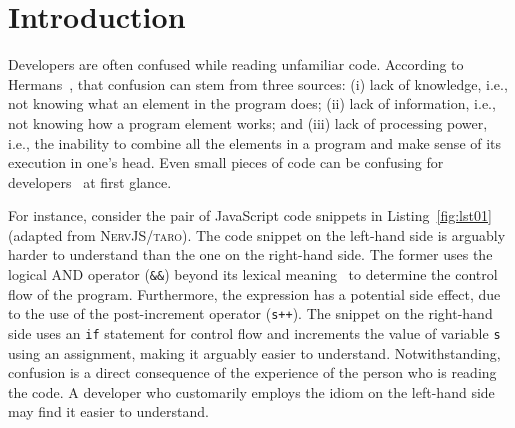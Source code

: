 \section{Introduction}
\label{intro}





Developers are often confused while reading unfamiliar code. According to Hermans~\cite{ProgrammersBrain}, that confusion can stem from three sources: (i) lack of knowledge, i.e., not knowing what an element in the program does; (ii) lack of information, i.e., not knowing how a program element works; and (iii) lack of processing power, i.e., the inability to combine all the elements in a program and make sense of its execution in one's head. Even small pieces of code can be confusing for developers~\cite{Ajami:2017:SPI,DBLP:conf/sigsoft/GopsteinIYDZYC17} at first glance.

For instance, consider the pair of JavaScript code snippets in Listing~\ref{fig:lst01} (adapted from \textsc{NervJS/taro}). The code snippet on the left-hand side is arguably harder to understand than the one on the right-hand side. The former uses the logical AND operator (\texttt{\&\&}) beyond its lexical meaning~\cite{castor2018} to determine the control flow of the program. Furthermore, the expression has a potential side effect, due to the use of the post-increment operator (\texttt{s++}). The snippet on the right-hand side uses an \texttt{if} statement for control flow and increments the value of variable \texttt{s} using an assignment, making it arguably easier to understand. Notwithstanding, confusion is a direct consequence of the experience of the person who is reading the code. A developer who customarily employs the idiom on the left-hand side may find it easier to understand. 

